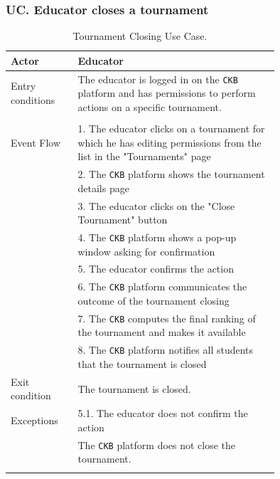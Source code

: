 \subsubsection*{UC\cuc . Educator closes a tournament}
\begin{center}
    \begin{longtable}{lp{0.75\linewidth}}
        \hline
        Actor            & Educator \\
        \hline
        Entry conditions & The educator is logged in on the \verb|CKB| platform and has permissions to perform actions on a specific tournament.\\                                                                                                               \\
        \hline
        Event Flow       
        & 1. The educator clicks on a tournament for which he has editing permissions from the list in the "Tournaments" page\\
        & 2. The \verb|CKB| platform shows the tournament details page\\
        & 3. The educator clicks on the "Close Tournament" button\\
        & 4. The \verb|CKB| platform shows a pop-up window asking for confirmation\\
        & 5. The educator confirms the action\\
        & 6. The \verb|CKB| platform communicates the outcome of the tournament closing\\
        & 7. The \verb|CKB| computes the final ranking of the tournament and makes it available\\
        & 8. The \verb|CKB| platform notifies all students that the tournament is closed\\
        \hline
        Exit condition   & The tournament is closed.   \\                                                                                                                                                                         
        \hline
        Exceptions   
        & 5.1. The educator does not confirm the action\\
            & The \verb|CKB| platform does not close the tournament.  \\
        \hline
        \caption{Tournament Closing Use Case.}
        \label{tab: tournament_closing_use_case}
    \end{longtable}


\end{center}
